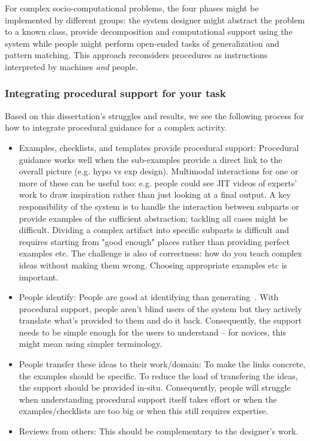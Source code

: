 For complex socio-computational problems, the four phases might be implemented by different groups: the system designer might abstract the problem to a known class, provide decomposition and computational support using the system while people might perform open-ended tasks of generalization and pattern matching. This approach reconsiders procedures as instructions interpreted by machines \textit{and} people.

\subsubsection{Integrating procedural support for your task}
Based on this dissertation's struggles and results, we see the following process for how to integrate procedural guidance for a complex activity.
\begin{itemize}
\item Examples, checklists, and templates provide procedural support: Procedural guidance works well when the sub-examples provide a direct link to the overall picture (e.g. hypo vs exp design).  Multimodal interactions for one or more of these can be useful too: e.g. people could see JIT videos of experts' work to draw inspiration rather than just looking at a final output. A key responsibility of the system is to handle the interaction between subparts or  provide examples of the sufficient abstraction; tackling all cases might be difficult. Dividing a complex artifact into specific subparts is difficult and requires starting from "good enough" places rather than providing perfect examples etc. The challenge is also of correctness: how do you teach complex ideas without making them wrong. Choosing appropriate examples etc is important.
\item People identify: People are good at identifying than generating~\cite{Stahl2006}. With procedural support, people aren’t blind users of the system but they actively translate what’s provided to them and do it back. Consequently, the support needs to be simple enough for the users to understand -- for novices, this might mean using simpler terminology. 
\item People transfer these ideas to their work/domain: To make the links concrete, the examples should be specific. To reduce the load of transfering the ideas, the support should be provided in-situ. Consequently, people will struggle when understanding procedural support itself takes effort or when the examples/checklists are too big or when this still requires expertise. 
\item Reviews from others: This should be complementary to the designer's work.
\end{itemize}


